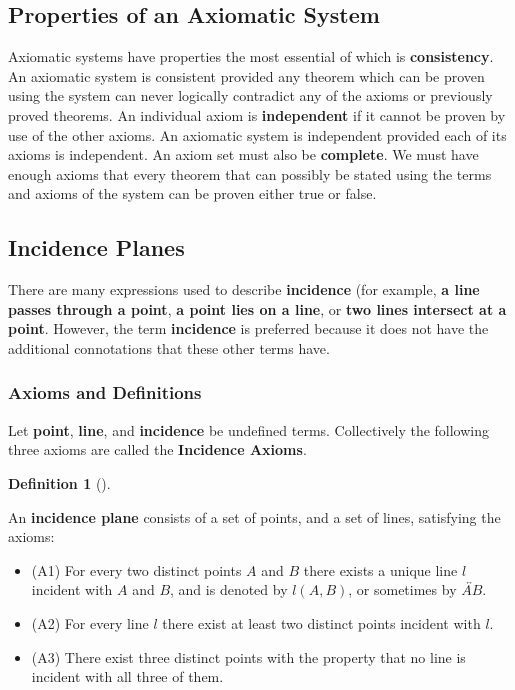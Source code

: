 \documentclass[
  twoside,
  12pt,
  letterpaper,
  fleqn]{article}
\providecommand{\tightlist}{%
  \setlength{\itemsep}{0pt}\setlength{\parskip}{0pt}}\usepackage{longtable,booktabs,array}
\theoremstyle{definition}
\newtheorem{definition}{Definition}[section]
\theoremstyle{definition}
\theoremstyle{plain}
\theoremstyle{plain}
\theoremstyle{remark}
\begin{document}
\hypertarget{properties-of-an-axiomatic-system}{%
\subsection{Properties of an Axiomatic
System}\label{properties-of-an-axiomatic-system}}

Axiomatic systems have properties the most essential of which is
\textbf{consistency}. An axiomatic system is consistent provided any
theorem which can be proven using the system can never logically
contradict any of the axioms or previously proved theorems. An
individual axiom is \textbf{independent} if it cannot be proven by use
of the other axioms. An axiomatic system is independent provided each of
its axioms is independent. An axiom set must also be \textbf{complete}.
We must have enough axioms that every theorem that can possibly be
stated using the terms and axioms of the system can be proven either
true or false.

\hypertarget{incidence-planes}{%
\subsection{Incidence Planes}\label{incidence-planes}}

There are many expressions used to describe \textbf{incidence} (for
example, \textbf{a line passes through a point}, \textbf{a point lies on
a line}, or \textbf{two lines intersect at a point}. However, the term
\textbf{incidence} is preferred because it does not have the additional
connotations that these other terms have.

\hypertarget{axioms-and-definitions}{%
\subsubsection{Axioms and Definitions}\label{axioms-and-definitions}}

Let \textbf{point}, \textbf{line}, and \textbf{incidence} be undefined
terms. Collectively the following three axioms are called the
\textbf{Incidence Axioms}.

\begin{definition}[]\protect\hypertarget{def-incidence-plane}{}\label{def-incidence-plane}

An \textbf{incidence plane} consists of a set of points, and a set of
lines, satisfying the axioms:

\end{definition}

\begin{itemize}
\tightlist
\item
  (A1) For every two distinct points \(A\) and \(B\) there exists a
  unique line \(l\) incident with \(A\) and \(B\), and is denoted by
  \(l(A,B)\), or sometimes by \(\overleftrightarrow{AB}\).
\item
  (A2) For every line \(l\) there exist at least two distinct points
  incident with \(l\).
\item
  (A3) There exist three distinct points with the property that no line
  is incident with all three of them.
\end{itemize}
\end{document}
